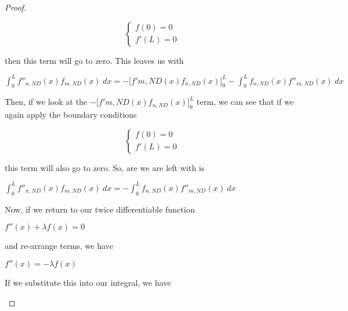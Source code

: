 \documentclass[executivepaper]{article}
\begin{document}
\begin{flushleft}
\begin{proof}
\begin{center}
\[ \begin{cases} 
      f(0)=0 \\
      f'(L)=0
   \end{cases}
\]

\end{center}

then this term will go to zero. This leaves us with

\begin{center}

$\int_{0}^{L} f''_{n, ND}(x)f_{m, ND}(x) \ dx=- \bigg[f'{m, ND}(x)f_{n, ND}(x)\bigg]_{0}^{L} - \int_{0}^{L} f_{n, ND}(x)f''_{m, ND}(x) \ dx$

\end{center}

Then, if we look at the $- \bigg[f'{m, ND}(x)f_{n, ND}(x)\bigg]_{0}^{L}$ term, we can see that if we again apply the boundary conditions

\begin{center}

\[ \begin{cases} 
      f(0)=0 \\
      f'(L)=0
   \end{cases}
\]

\end{center}

this term will also go to zero. So, are we are left with is

\begin{center}

$\int_{0}^{L} f''_{n, ND}(x)f_{m, ND}(x) \ dx=- \int_{0}^{L} f_{n, ND}(x)f''_{m, ND}(x) \ dx$

\end{center}

Now, if we return to our twice differentiable function

\begin{center}

$f''(x)+\lambda f(x)=0$

\end{center}

and re-arrange terms, we have

\begin{center}

$f''(x)=-\lambda f(x)$

\end{center}

If we substitute this into our integral, we have

\begin{center}


\end{center}
\end{proof}
\end{flushleft}
\end{document}
